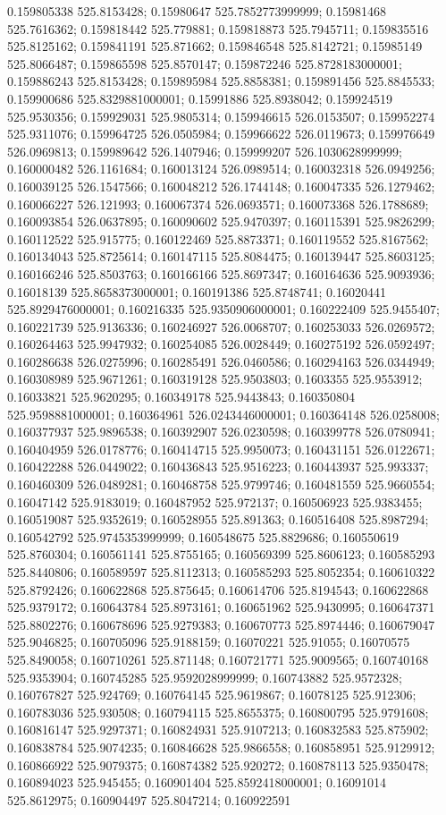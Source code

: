 0.159805338 525.8153428; 0.15980647 525.7852773999999; 0.15981468 525.7616362; 0.159818442 525.779881; 0.159818873 525.7945711; 0.159835516 525.8125162; 0.159841191 525.871662; 0.159846548 525.8142721; 0.15985149 525.8066487; 0.159865598 525.8570147; 0.159872246 525.8728183000001; 0.159886243 525.8153428; 0.159895984 525.8858381; 0.159891456 525.8845533; 0.159900686 525.8329881000001; 0.15991886 525.8938042; 0.159924519 525.9530356; 0.159929031 525.9805314; 0.159946615 526.0153507; 0.159952274 525.9311076; 0.159964725 526.0505984; 0.159966622 526.0119673; 0.159976649 526.0969813; 0.159989642 526.1407946; 0.159999207 526.1030628999999; 0.160000482 526.1161684; 0.160013124 526.0989514; 0.160032318 526.0949256; 0.160039125 526.1547566; 0.160048212 526.1744148; 0.160047335 526.1279462; 0.160066227 526.121993; 0.160067374 526.0693571; 0.160073368 526.1788689; 0.160093854 526.0637895; 0.160090602 525.9470397; 0.160115391 525.9826299; 0.160112522 525.915775; 0.160122469 525.8873371; 0.160119552 525.8167562; 0.160134043 525.8725614; 0.160147115 525.8084475; 0.160139447 525.8603125; 0.160166246 525.8503763; 0.160166166 525.8697347; 0.160164636 525.9093936; 0.16018139 525.8658373000001; 0.160191386 525.8748741; 0.16020441 525.8929476000001; 0.160216335 525.9350906000001; 0.160222409 525.9455407; 0.160221739 525.9136336; 0.160246927 526.0068707; 0.160253033 526.0269572; 0.160264463 525.9947932; 0.160254085 526.0028449; 0.160275192 526.0592497; 0.160286638 526.0275996; 0.160285491 526.0460586; 0.160294163 526.0344949; 0.160308989 525.9671261; 0.160319128 525.9503803; 0.1603355 525.9553912; 0.16033821 525.9620295; 0.160349178 525.9443843; 0.160350804 525.9598881000001; 0.160364961 526.0243446000001; 0.160364148 526.0258008; 0.160377937 525.9896538; 0.160392907 526.0230598; 0.160399778 526.0780941; 0.160404959 526.0178776; 0.160414715 525.9950073; 0.160431151 526.0122671; 0.160422288 526.0449022; 0.160436843 525.9516223; 0.160443937 525.993337; 0.160460309 526.0489281; 0.160468758 525.9799746; 0.160481559 525.9660554; 0.16047142 525.9183019; 0.160487952 525.972137; 0.160506923 525.9383455; 0.160519087 525.9352619; 0.160528955 525.891363; 0.160516408 525.8987294; 0.160542792 525.9745353999999; 0.160548675 525.8829686; 0.160550619 525.8760304; 0.160561141 525.8755165; 0.160569399 525.8606123; 0.160585293 525.8440806; 0.160589597 525.8112313; 0.160585293 525.8052354; 0.160610322 525.8792426; 0.160622868 525.875645; 0.160614706 525.8194543; 0.160622868 525.9379172; 0.160643784 525.8973161; 0.160651962 525.9430995; 0.160647371 525.8802276; 0.160678696 525.9279383; 0.160670773 525.8974446; 0.160679047 525.9046825; 0.160705096 525.9188159; 0.16070221 525.91055; 0.16070575 525.8490058; 0.160710261 525.871148; 0.160721771 525.9009565; 0.160740168 525.9353904; 0.160745285 525.9592028999999; 0.160743882 525.9572328; 0.160767827 525.924769; 0.160764145 525.9619867; 0.16078125 525.912306; 0.160783036 525.930508; 0.160794115 525.8655375; 0.160800795 525.9791608; 0.160816147 525.9297371; 0.160824931 525.9107213; 0.160832583 525.875902; 0.160838784 525.9074235; 0.160846628 525.9866558; 0.160858951 525.9129912; 0.160866922 525.9079375; 0.160874382 525.920272; 0.160878113 525.9350478; 0.160894023 525.945455; 0.160901404 525.8592418000001; 0.16091014 525.8612975; 0.160904497 525.8047214; 0.160922591 